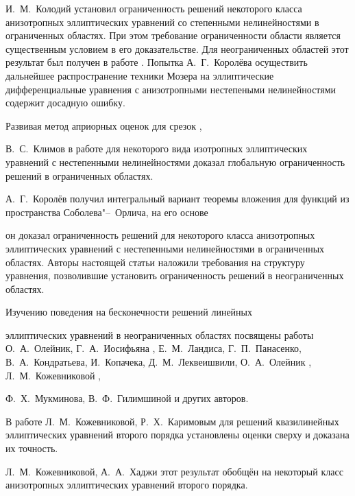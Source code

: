 И.~М.~Колодий \cite{KozhKhad:bib:Kolodii} установил ограниченность решений некоторого класса анизотропных эллиптических уравнений со степенными нелинейностями в ограниченных областях. При этом требование ограниченности области является существенным условием в его доказательстве.  Для неограниченных областей этот результат был получен в работе \cite{KozhKhad:bib:KozhKhad2}. Попытка А.~Г.~Королёва \cite{KozhKhad:bib:Korolev3} осуществить дальнейшее распространение техники Мозера на эллиптические дифференциальные уравнения с анизотропными  нестепеными нелинейностями  содержит досадную ошибку.



Развивая метод априорных оценок для срезок \cite[гл. II, \S~5, лемма 5.1]{KozhKhad:bib:LadizhYralc},

В.~С.~Климов в работе \cite{KozhKhad:bib:Klimov3} для некоторого вида изотропных эллиптических уравнений с нестепенными нелинейностями доказал глобальную ограниченность решений в ограниченных областях.

А.~Г.~Королёв  \cite{KozhKhad:bib:Korolev2} получил интегральный вариант теоремы вложения для функций из пространства Соболева"--~Орлича, на его основе

он доказал ограниченность решений для некоторого класса анизотропных эллиптических  уравнений с нестепенными нелинейностями в ограниченных областях. Авторы  настоящей статьи  наложили требования на структуру уравнения, позволившие  установить ограниченность решений в неограниченных  областях.



Изучению поведения на бесконечности решений линейных

эллиптических уравнений в неограниченных областях посвящены работы О.~А.~Олейник, Г.~А.~Иосифьяна \cite{KozhKhad:bib:OlIosif}, Е.~М.~Ландиса, Г.~П.~Панасенко, В.~А.~Кондратьева, И.~Копачека, Д.~М.~Леквеишвили, О.~А.~Олейник \cite {KozhKhad:bib:KondKopLek}, Л.~М.~Кожевниковой \cite{KozhKhad:bib:Kozhevnikova},

Ф.~Х.~Мукминова, В.~Ф.~Гилимшиной \cite{KozhKhad:bib:GilMuk} и других авторов.

В работе \cite{KozhKhad:bib:KozhKarimov} Л.~М.~Кожевниковой, Р.~Х.~Каримовым для решений   квазилинейных эллиптических уравнений второго порядка установлены оценки  сверху и доказана их точность.

Л.~М.~Кожевниковой, А.~А.~Хаджи \cite{KozhKhad:bib:KozhKhad1} этот результат обобщён на некоторый класс анизотропных эллиптических уравнений второго порядка.

